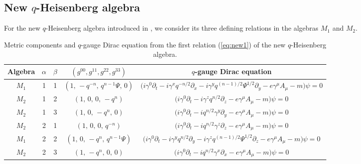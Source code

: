 \documentclass[12pt,a4paper]{article}
\theoremstyle{plain}
\theoremstyle{definition}
\begin{document}
\subsection{New $q$-Heisenberg algebra}
For the new $q$-Heisenberg algebra introduced in \cite{Jaramillo2025}, we consider its three defining relations in the algebras $M_1$ and $M_2$.

\begin{table}[H]
\centering\small
\caption{Metric components and $q$-gauge Dirac equation from the first relation (\ref{eq:new1}) of the new $q$-Heisenberg algebra.}
\label{tab:new1-dirac}
\begin{tiny}
\begin{tabular}{@{}cccccc@{}}
\toprule
Algebra & $\alpha$ & $\beta$ & $(g^{00},g^{11},g^{22},g^{33})$ & \multicolumn{2}{c}{$q$-gauge Dirac equation} \\
\midrule
$M_1$ & 1 & 1 & $(1,\,-q^{-n},\,q^{n-1}\Psi,\,0)$ & \multicolumn{2}{c}{$\bigl( i\gamma^{0}\partial_t - i\gamma^{x} q^{-n/2}\partial_x - i\gamma^{y} q^{(n-1)/2}\Psi^{1/2}\partial_y - e\gamma^{\mu}A_{\mu} - m \bigr)\psi = 0$} \\
$M_2$ & 1 & 2 & $(1,\,0,\,0,\,-q^{n})$ & \multicolumn{2}{c}{$\bigl( i\gamma^{0}\partial_t - i\gamma^{z} q^{n/2}\partial_z - e\gamma^{\mu}A_{\mu} - m \bigr)\psi = 0$} \\
$M_2$ & 1 & 3 & $(1,\,0,\,-q^{n},\,0)$ & \multicolumn{2}{c}{$\bigl( i\gamma^{0}\partial_t - i q^{n/2}\gamma^{y}\partial_y - e\gamma^{\mu}A_{\mu} - m \bigr)\psi = 0$} \\
$M_2$ & 2 & 1 & $(1,\,0,\,0,\,q^{-n})$ & \multicolumn{2}{c}{$\bigl( i\gamma^{0}\partial_t - i q^{n/2}\gamma^{z}\partial_z - e\gamma^{\mu}A_{\mu} - m \bigr)\psi = 0$} \\
$M_1$ & 2 & 2 & $(1,\,0,\,-q^{n},\,q^{n-1}\Psi)$ & \multicolumn{2}{c}{$\bigl( i\gamma^{0}\partial_t - i\gamma^{y} q^{n/2}\partial_y - i\gamma^{z} q^{(n-1)/2}\Psi^{1/2}\partial_z - e\gamma^{\mu}A_{\mu} - m \bigr)\psi = 0$} \\
$M_2$ & 2 & 3 & $(1,\,-q^{n},\,0,\,0)$ & \multicolumn{2}{c}{$\bigl( i\gamma^{0}\partial_t - i q^{n/2}\gamma^{x}\partial_x - e\gamma^{\mu}A_{\mu} - m \bigr)\psi = 0$} \\
\bottomrule
\end{tabular}
\end{tiny}
\end{table}
\end{document}
